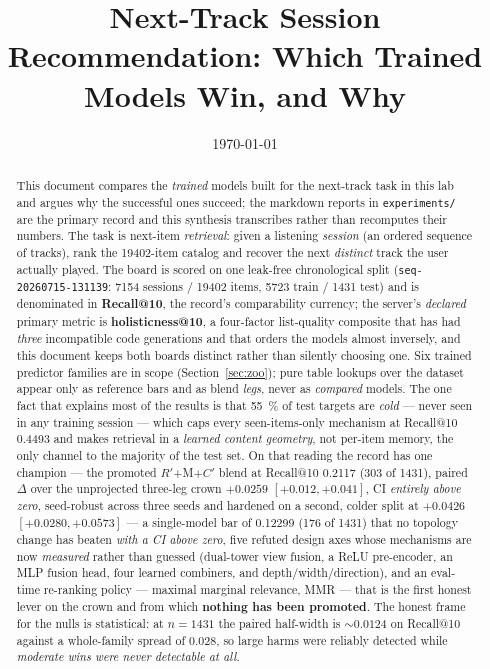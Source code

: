 \documentclass[11pt]{article}
\title{Next-Track Session Recommendation: Which Trained Models Win, and Why}
\author{}
\date{\today}
\newcommand{\dsid}[1]{\texttt{\small #1}}
\newcommand{\Rp}{\ensuremath{R'}}
\newcommand{\Cp}{\ensuremath{C'}}
\begin{document}
\maketitle

\begin{abstract}
This document compares the \emph{trained} models built for the next-track task
in this lab and argues why the successful ones succeed; the markdown reports in
\texttt{experiments/} are the primary record and this synthesis transcribes
rather than recomputes their numbers. The task is next-item \emph{retrieval}:
given a listening \emph{session} (an ordered sequence of tracks), rank the
\num{19402}-item catalog and recover the next \emph{distinct} track the user
actually played. The board is scored on one leak-free chronological split
(\dsid{seq-20260715-131139}: \num{7154} sessions / \num{19402} items,
\num{5723} train / \num{1431} test) and is denominated in \textbf{Recall@10},
the record's comparability currency; the server's \emph{declared} primary metric
is \textbf{holisticness@10}, a four-factor list-quality composite that has had
\emph{three} incompatible code generations and that orders the models almost
inversely, and this document keeps both boards distinct rather than silently
choosing one. Six trained predictor families are in scope
(Section~\ref{sec:zoo}); pure table lookups over the dataset appear only as
reference bars and as blend \emph{legs}, never as \emph{compared} models. The
one fact that explains most of the results is that \SI{55}{\percent} of test
targets are \emph{cold} --- never seen in any training session --- which caps
every seen-items-only mechanism at Recall@10 \num{0.4493} and makes retrieval in
a \emph{learned content geometry}, not per-item memory, the only channel to the
majority of the test set. On that reading the record has one champion --- the
promoted \Rp+M+\Cp{} blend at Recall@10 \num{0.2117} (\num{303} of \num{1431}),
paired $\Delta$ over the unprojected three-leg crown $+\num{0.0259}$
$[+0.012,+0.041]$, CI \emph{entirely above zero}, seed-robust across three seeds
and hardened on a second, colder split at $+\num{0.0426}$
$[+\num{0.0280},+\num{0.0573}]$ --- a single-model bar of \num{0.12299}
(\num{176} of \num{1431}) that no topology change has beaten \emph{with a CI
above zero}, five refuted design axes whose mechanisms are now \emph{measured}
rather than guessed (dual-tower view fusion, a ReLU pre-encoder, an MLP fusion
head, four learned combiners, and depth/width/direction), and an eval-time
re-ranking policy --- maximal marginal relevance, MMR --- that is the first
honest lever on the crown and from which \textbf{nothing has been promoted}. The
honest frame for the nulls is statistical: at $n=\num{1431}$ the paired
half-width is ${\sim}\num{0.0124}$ on Recall@10 against a whole-family spread of
\num{0.028}, so large harms were reliably detected while \emph{moderate wins
were never detectable at all}.
\end{abstract}
\end{document}
